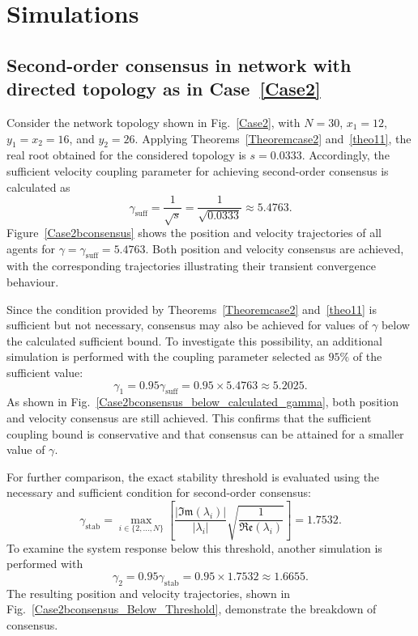 \section{Simulations} 
\subsection{Second-order consensus in network with directed topology as in Case~\ref{Case2}}
Consider the network topology shown in Fig.~\ref{Case2}, with $N=30$, $x_1=12$, $y_1=x_2=16$, and $y_2=26$. Applying Theorems~\ref{Theoremcase2} and~\ref{theo11}, the real root obtained for the considered topology is $s=0.0333$. Accordingly, the sufficient velocity coupling parameter for achieving second-order consensus is calculated as
\begin{equation}
    \gamma_{\mathrm{suff}}
    =\frac{1}{\sqrt{s}}
    =\frac{1}{\sqrt{0.0333}}
    \approx 5.4763.
\end{equation}
Figure~\ref{Case2bconsensus} shows the position and velocity trajectories of all agents for $\gamma=\gamma_{\mathrm{suff}}=5.4763$. Both position and velocity consensus are achieved, with the corresponding trajectories illustrating their transient convergence behaviour.

Since the condition provided by Theorems~\ref{Theoremcase2} and~\ref{theo11} is sufficient but not necessary, consensus may also be achieved for values of $\gamma$ below the calculated sufficient bound. To investigate this possibility, an additional simulation is performed with the coupling parameter selected as $95\%$ of the sufficient value:
\begin{equation}
    \gamma_1=0.95\gamma_{\mathrm{suff}}
    =0.95\times5.4763
    \approx 5.2025.
\end{equation}
As shown in Fig.~\ref{Case2bconsensus_below_calculated_gamma}, both position and velocity consensus are still achieved. This confirms that the sufficient coupling bound is conservative and that consensus can be attained for a smaller value of $\gamma$.

For further comparison, the exact stability threshold is evaluated using the necessary and sufficient condition for second-order consensus:
\begin{equation}
    \gamma_{\mathrm{stab}}
    =
    \max_{i\in\{2,\ldots,N\}}
    \left[
    \frac{|\mathfrak{Im}(\lambda_i)|}{|\lambda_i|}
    \sqrt{\frac{1}{\mathfrak{Re}(\lambda_i)}}
    \right]
    =1.7532.
\end{equation}
To examine the system response below this threshold, another simulation is performed with
\begin{equation}
    \gamma_2=0.95\gamma_{\mathrm{stab}}
    =0.95\times1.7532
    \approx 1.6655.
\end{equation}
The resulting position and velocity trajectories, shown in Fig.~\ref{Case2bconsensus_Below_Threshold}, demonstrate the breakdown of consensus.

